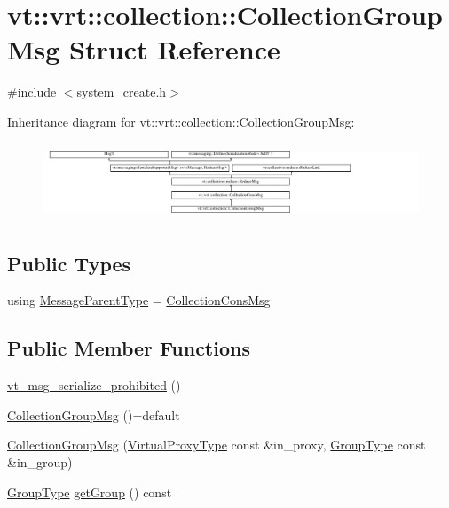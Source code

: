 \hypertarget{structvt_1_1vrt_1_1collection_1_1_collection_group_msg}{}\section{vt\+:\+:vrt\+:\+:collection\+:\+:Collection\+Group\+Msg Struct Reference}
\label{structvt_1_1vrt_1_1collection_1_1_collection_group_msg}


{\ttfamily \#include $<$system\+\_\+create.\+h$>$}

Inheritance diagram for vt\+:\+:vrt\+:\+:collection\+:\+:Collection\+Group\+Msg\+:\begin{figure}[H]
\begin{center}
\leavevmode
\includegraphics[height=2.304527cm]{structvt_1_1vrt_1_1collection_1_1_collection_group_msg}
\end{center}
\end{figure}
\subsection*{Public Types}
\begin{DoxyCompactItemize}
\item 
using \hyperlink{structvt_1_1vrt_1_1collection_1_1_collection_group_msg_a4468c3f74ebd21257bfbb35222ac1fa4}{Message\+Parent\+Type} = \hyperlink{structvt_1_1vrt_1_1collection_1_1_collection_cons_msg}{Collection\+Cons\+Msg}
\end{DoxyCompactItemize}
\subsection*{Public Member Functions}
\begin{DoxyCompactItemize}
\item 
\hyperlink{structvt_1_1vrt_1_1collection_1_1_collection_group_msg_ae4d92c74c6899563aada25b9d5ffad06}{vt\+\_\+msg\+\_\+serialize\+\_\+prohibited} ()
\item 
\hyperlink{structvt_1_1vrt_1_1collection_1_1_collection_group_msg_a3b5c4da131f779c814ede149ec3fbb81}{Collection\+Group\+Msg} ()=default
\item 
\hyperlink{structvt_1_1vrt_1_1collection_1_1_collection_group_msg_abae6c35e09794b3c43c7b6c39f489196}{Collection\+Group\+Msg} (\hyperlink{namespacevt_a1b417dd5d684f045bb58a0ede70045ac}{Virtual\+Proxy\+Type} const \&in\+\_\+proxy, \hyperlink{namespacevt_a27b5e4411c9b6140c49100e050e2f743}{Group\+Type} const \&in\+\_\+group)
\item 
\hyperlink{namespacevt_a27b5e4411c9b6140c49100e050e2f743}{Group\+Type} \hyperlink{structvt_1_1vrt_1_1collection_1_1_collection_group_msg_a109efca9965d4d4353d6b0a317297600}{get\+Group} () const
\end{DoxyCompactItemize}
